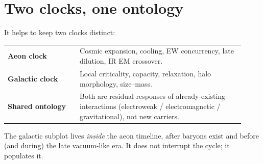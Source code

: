 \documentclass[11pt]{article}
\begin{document}
\section{Two clocks, one ontology}
\label{sec:two-clocks}
It helps to keep two clocks distinct:
\begin{center}
\small
\begin{tabular}{@{}>{\bfseries}p{0.28\linewidth}p{0.64\linewidth}@{}}
\toprule
Aeon clock & Cosmic expansion, cooling, EW concurrency, late dilution, IR EM crossover.\\
Galactic clock & Local criticality, capacity, relaxation, halo morphology, size--mass.\\
\midrule
Shared ontology & Both are residual responses of already-existing interactions
(electroweak / electromagnetic / gravitational), not new carriers.\\
\bottomrule
\end{tabular}
\end{center}
The galactic subplot lives \emph{inside} the aeon timeline, after baryons exist and
before (and during) the late vacuum-like era.
It does not interrupt the cycle; it populates it.
\end{document}

